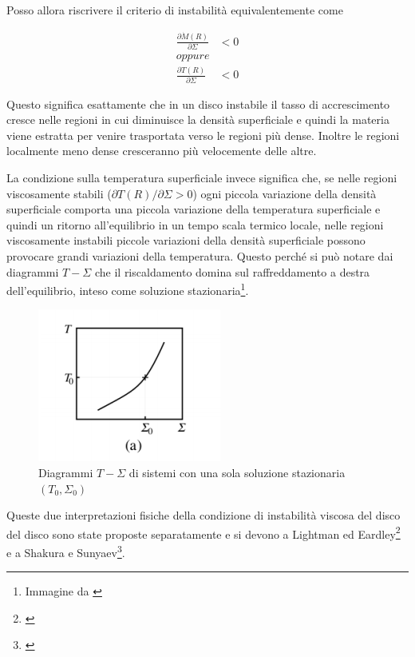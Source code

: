 \documentclass[a4paperbi]{article}
\begin{document}
	Posso allora riscrivere il criterio di instabilità equivalentemente come
	
	\begin{align*}
		\frac{\partial\dot{M}(R)}{\partial\Sigma}&<0 \\
		\textit{oppure} \\
		\frac{\partial T(R)}{\partial\Sigma}&<0
	\end{align*}
	
	Questo significa esattamente che in un disco instabile il tasso di accrescimento cresce nelle regioni in cui diminuisce la densità superficiale e quindi la materia viene estratta per venire trasportata verso le regioni più dense. Inoltre le regioni localmente meno dense cresceranno più velocemente delle altre.
	
	La condizione sulla temperatura superficiale invece significa che, se nelle regioni viscosamente stabili ($\partial T(R)/\partial\Sigma>0$) ogni piccola variazione della densità superficiale comporta una piccola variazione della temperatura superficiale e quindi un ritorno all'equilibrio in un tempo scala termico locale, nelle regioni viscosamente instabili piccole variazioni della densità superficiale possono provocare grandi variazioni della temperatura. Questo perché si può notare dai diagrammi $T-\Sigma$ che il riscaldamento domina sul raffreddamento a destra dell'equilibrio, inteso come soluzione stazionaria\footnote{Immagine da \cite{FrankKingRaineAccretionPower}}.	
	
	\begin{figure}[H]
		\centering
		\includegraphics[width=0.4\linewidth]{TemperaturaDensita}
		\caption{Diagrammi $T-\Sigma$ di sistemi con una sola soluzione stazionaria $(T_0,\Sigma_0)$}
		\label{fig:TemperaturaDensita}
	\end{figure}
	
	Queste due interpretazioni fisiche della condizione di instabilità viscosa del disco del disco sono state proposte separatamente e si devono a Lightman ed Eardley\footnote{\cite{LightmanEardley1974}} e a Shakura e Sunyaev\footnote{\cite{ShakuraSunyaev1976}}.
\end{document}
